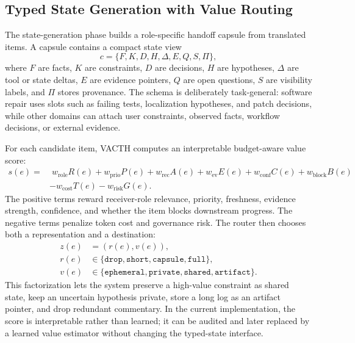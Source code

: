 \documentclass{article} %
\begin{document}
\subsection{Typed State Generation with Value Routing}

The state-generation phase builds a role-specific handoff capsule from translated items. A capsule contains a compact state view
\begin{equation}
c = \{F,K,D,H,\Delta,E,Q,S,\Pi\},
\end{equation}
where $F$ are facts, $K$ are constraints, $D$ are decisions, $H$ are hypotheses, $\Delta$ are tool or state deltas, $E$ are evidence pointers, $Q$ are open questions, $S$ are visibility labels, and $\Pi$ stores provenance. The schema is deliberately task-general: software repair uses slots such as failing tests, localization hypotheses, and patch decisions, while other domains can attach user constraints, observed facts, workflow decisions, or external evidence.

For each candidate item, VACTH computes an interpretable budget-aware value score:
\begin{align}
s(e)=&\;w_{\mathrm{role}}R(e)+w_{\mathrm{prio}}P(e)+w_{\mathrm{rec}}A(e)+w_{\mathrm{ev}}E(e)
+w_{\mathrm{conf}}C(e)+w_{\mathrm{block}}B(e) \nonumber\\
&-w_{\mathrm{cost}}T(e)-w_{\mathrm{risk}}G(e).
\end{align}
The positive terms reward receiver-role relevance, priority, freshness, evidence strength, confidence, and whether the item blocks downstream progress. The negative terms penalize token cost and governance risk. The router then chooses both a representation and a destination:
\begin{equation}
\begin{split}
z(e) &= (r(e), v(e)), \\
r(e) &\in \{\mathtt{drop}, \mathtt{short}, \mathtt{capsule}, \mathtt{full}\}, \\
v(e) &\in \{\mathtt{ephemeral}, \mathtt{private}, \mathtt{shared}, \mathtt{artifact}\}.
\end{split}
\end{equation}
This factorization lets the system preserve a high-value constraint as shared state, keep an uncertain hypothesis private, store a long log as an artifact pointer, and drop redundant commentary. In the current implementation, the score is interpretable rather than learned; it can be audited and later replaced by a learned value estimator without changing the typed-state interface.
\end{document}
